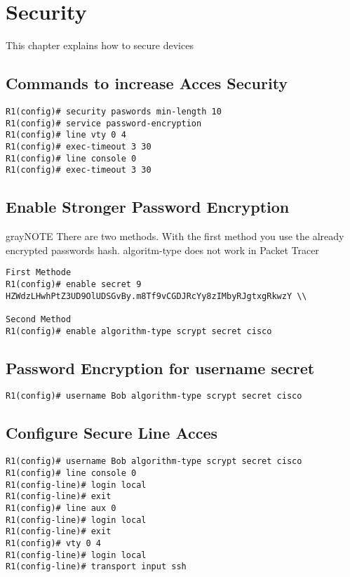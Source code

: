 \section{Security}
This chapter explains how to secure devices 
\subsection{Commands to increase Acces Security}
\begin{verbatim}
R1(config)# security paswords min-length 10 
R1(config)# service password-encryption
R1(config)# line vty 0 4 
R1(config)# exec-timeout 3 30
R1(config)# line console 0 
R1(config)# exec-timeout 3 30
\end{verbatim}

\subsection{Enable Stronger Password Encryption}
\begin{textbox}{gray}{NOTE}
There are two methods. With the first method you use the already encrypted passwords hash. algoritm-type does not work in Packet Tracer 
\end{textbox}
\begin{verbatim}
First Methode
R1(config)# enable secret 9 HZWdzLHwhPtZ3UD9OlUDSGvBy.m8Tf9vCGDJRcYy8zIMbyRJgtxgRkwzY \\

Second Method
R1(config)# enable algorithm-type scrypt secret cisco 
\end{verbatim}

\subsection{Password Encryption for username secret}
\begin{verbatim}
R1(config)# username Bob algorithm-type scrypt secret cisco
\end{verbatim}

\subsection{Configure Secure Line Acces}
\begin{verbatim}
R1(config)# username Bob algorithm-type scrypt secret cisco
R1(config)# line console 0 
R1(config-line)# login local 
R1(config-line)# exit
R1(config)# line aux 0 
R1(config-line)# login local
R1(config-line)# exit
R1(config)# vty 0 4 
R1(config-line)# login local 
R1(config-line)# transport input ssh 
\end{verbatim}


